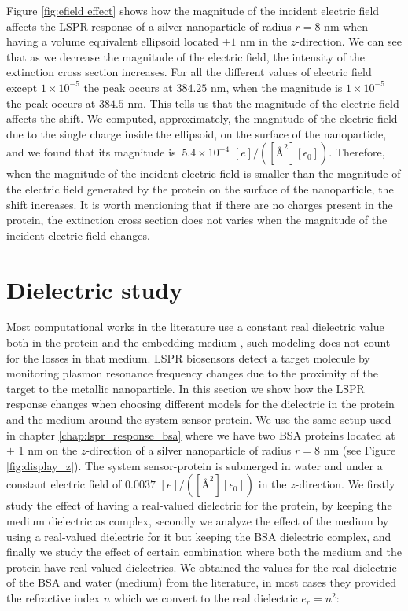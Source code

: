 Figure \ref{fig:efield effect} shows how the magnitude of the incident electric field affects the LSPR response 
of a silver nanoparticle of radius $r=8$ nm when having a volume equivalent ellipsoid located 
$\pm 1$ nm in the $z$-direction. We can see that as we decrease the magnitude of the electric field, 
the intensity of the extinction cross section increases. For all the different values of electric field except 
$1\times10^{-5}$ the peak occurs at $384.25$ nm, when the magnitude is $1\times10^{-5}$ the peak occurs at 
$384.5$ nm. This tells us that the magnitude of the electric field affects the shift. We computed, approximately, 
the magnitude of the electric field due to the single charge inside the ellipsoid, on the surface of the nanoparticle,
and we found that its magnitude is $~5.4 \times 10^{-4}$ $[e]/([{\text{\AA}}^2][\epsilon_0])$. Therefore, 
when the magnitude of the incident electric field is smaller than the magnitude of the electric field generated by 
the protein on the surface of the nanoparticle, the shift increases. It is worth mentioning that if there are no charges 
present in the protein, the extinction cross section does not varies when the magnitude of the incident electric field 
changes. 

\section{Dielectric study}

Most computational works in the literature use a constant real dielectric value both in the protein and the
embedding medium \cite{NghiemETal2012, SantiagoCordobaETal2011,UngerETal2009}, such modeling does not count for the losses 
in that medium. LSPR biosensors detect a target molecule by monitoring plasmon resonance frequency changes due to the proximity 
of the target to the metallic nanoparticle. In this section we show how the LSPR response changes when choosing different models 
for the dielectric in the protein and the medium around the system sensor-protein. We use the same setup used in chapter \ref{chap:lspr_response_bsa}
where we have two BSA proteins located at $\pm$ 1 nm on the $z$-direction of a silver nanoparticle of radius $r=8$ nm (see 
Figure \ref{fig:display_z}). The system sensor-protein is submerged in water and under a constant electric field of 
$0.0037$ $[e]/([{\text{\AA}}^2][\epsilon_0])$ in the $z$-direction. We firstly study the effect of having a real-valued dielectric 
for the protein, by keeping the medium dielectric as complex, secondly we analyze the effect of the medium by using a real-valued 
dielectric for it but keeping the BSA dielectric complex, and finally we study the effect of certain combination where both the medium 
and the protein have real-valued dielectrics. We obtained the values for the real dielectric of the BSA and water (medium) from the literature,
in most cases they provided the refractive index $n$ which we convert to the real dielectric $e_r=n^2$:  

